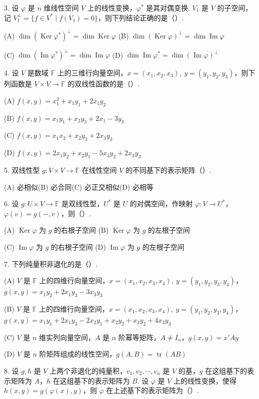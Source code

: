 \documentclass[UTF8, 12pt, fontset=fandol, oneside]{ctexart}
\begin{document}
3. 设 $\varphi$ 是 $n$ 维线性空间 $V$ 上的线性变换，$\varphi^*$ 是其对偶变换. $V_1$ 是 $V$ 的子空间，记 $V_1^\perp=\{f\in V^*\mid f(V_1)=0\}$，则下列结论正确的是（\quad ）.

(A) $\dim(\operatorname{Ker}\varphi^*)^\perp=\dim\operatorname{Ker}\varphi$
\quad
(B) $\dim(\operatorname{Ker}\varphi)^\perp=\dim\operatorname{Im}\varphi$

(C) $\dim(\operatorname{Im}\varphi^*)^\perp=\dim\operatorname{Im}\varphi$
\quad
(D) $\dim\operatorname{Im}\varphi^*=\dim(\operatorname{Im}\varphi)^\perp$

4. 设 $V$ 是数域 $\mathbb{F}$ 上的三维行向量空间，$x=(x_1,x_2,x_3),\ y=(y_1,y_2,y_3)$，则下列函数是 $V\times V\to\mathbb{F}$ 的双线性函数的是（\quad ）.

(A) $f(x,y)=x_1^2+x_1y_1+2x_1y_2$

(B) $f(x,y)=x_1y_1+x_2y_3+2x_1-3y_3$

(C) $f(x,y)=x_1x_2+x_2y_3+2x_3y_3$

(D) $f(x,y)=2x_1y_2+x_2y_1-5x_3y_2+2x_3y_3$

5. 双线性型 $g:V\times V\to\mathbb{F}$ 在线性空间 $V$ 的不同基下的表示矩阵（\quad ）.

(A) 必相似\quad (B) 必合同\quad (C) 必正交相似\quad (D) 必相等

6. 设 $g:U\times V\to\mathbb{F}$ 是双线性型，$U^*$ 是 $U$ 的对偶空间，作映射 $\varphi:V\to U^*$，$\varphi(v)=g(-,v)$，则（\quad ）.

(A) $\operatorname{Ker}\varphi$ 为 $g$ 的右根子空间
\quad
(B) $\operatorname{Ker}\varphi$ 为 $g$ 的左根子空间

(C) $\operatorname{Im}\varphi$ 为 $g$ 的右根子空间
\quad
(D) $\operatorname{Im}\varphi$ 为 $g$ 的左根子空间

7. 下列纯量积非退化的是（\quad ）.

(A) $V$ 是 $\mathbb{F}$ 上的四维行向量空间，$x=(x_1,x_2,x_3,x_4),\ y=(y_1,y_2,y_3,y_4)$，$g(x,y)=x_1y_2+2x_1y_3-3x_3y_3$

(B) $V$ 是 $\mathbb{F}$ 上的四维行向量空间，$x=(x_1,x_2,x_3,x_4),\ y=(y_1,y_2,y_3,y_4)$，$g(x,y)=x_1y_1+2x_1y_3-2x_2y_1+x_2y_2+x_3y_2+4x_3y_3$

(C) $V$ 是 $n$ 维实列向量空间，$A$ 是 $n$ 阶幂等矩阵，$A\ne I_n$，$g(x,y)=x'Ay$

(D) $V$ 是 $n$ 阶矩阵组成的线性空间，$g(A,B)=\operatorname{tr}(AB)$

8. 设 $g,h$ 是 $V$ 上两个非退化的纯量积，$v_1,v_2,\cdots,v_n$ 是 $V$ 的基，$g$ 在这组基下的表示矩阵为 $A$，$h$ 在这组基下的表示矩阵为 $B$. 设 $\varphi$ 是 $V$ 上的线性变换，使得 $h(x,y)=g(\varphi(x),y)$，则 $\varphi$ 在上述基下的表示矩阵为（\quad ）.
\end{document}
